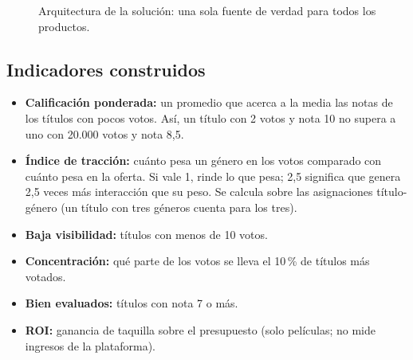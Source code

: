 \documentclass[conference,a4paper]{IEEEtran}
\begin{document}
\begin{figure}[!t]
\centering
{}
\caption{Arquitectura de la solución: una sola fuente de verdad para todos los productos.}
\label{fig:arquitectura}
\end{figure}

\subsection{Indicadores construidos}
\begin{itemize}
\item \textbf{Calificación ponderada:} un promedio que acerca a la media las notas de los títulos con pocos votos. Así, un título con 2 votos y nota 10 no supera a uno con 20.000 votos y nota 8,5.
\item \textbf{Índice de tracción:} cuánto pesa un género en los votos comparado con cuánto pesa en la oferta. Si vale 1, rinde lo que pesa; 2,5 significa que genera 2,5 veces más interacción que su peso. Se calcula sobre las asignaciones título-género (un título con tres géneros cuenta para los tres).
\item \textbf{Baja visibilidad:} títulos con menos de 10 votos.
\item \textbf{Concentración:} qué parte de los votos se lleva el 10\,\% de títulos más votados.
\item \textbf{Bien evaluados:} títulos con nota 7 o más.
\item \textbf{ROI:} ganancia de taquilla sobre el presupuesto (solo películas; no mide ingresos de la plataforma).
\end{itemize}
\end{document}
